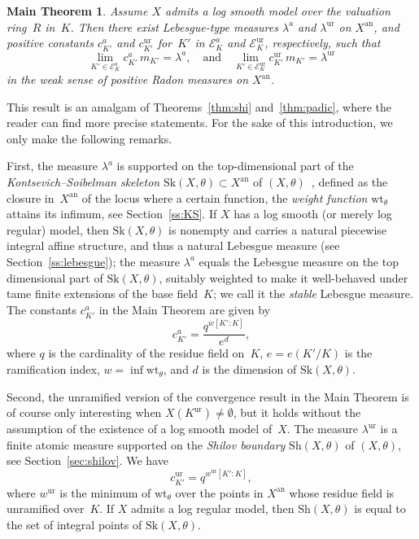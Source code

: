 \documentclass[11pt]{article}
\let\mathcal\mathscr
\newtheorem*{theorem*}{Main Theorem}
\theoremstyle{definition}
\numberwithin{equation}{subsection}
\newcommand{\an}{\mathrm{an}}
\newcommand{\Sh}{\mathrm{Sh}}
\newcommand{\Sk}{\mathrm{Sk}}
\newcommand{\ur}{\mathrm{ur}}
\newcommand{\wt}{\mathrm{wt}}
\let\form\theta
\let\Leb\lambda
\begin{document}
\begin{theorem*}
Assume $X$ admits a log smooth model over the valuation ring~$R$ in~$K$. Then there exist Lebesgue-type measures $\Leb^a$ and $\Leb^{\ur}$ on $X^{\an}$, and positive constants $c_{K'}^a$ and $c_{K'}^{\ur}$ for~$K'$ in $\mathcal{E}^a_K$ and $\mathcal{E}^{\ur}_K$, respectively, such that
\begin{equation*}
\lim_{K'\in\mathcal{E}^a_K}c_{K'}^a\,m_{K'}=\Leb^a,
\quad\text{and}\quad
\lim_{K'\in\mathcal{E}^{\ur}_K}c^{\ur}_{K'}\,m_{K'}=\Leb^{\ur}
\end{equation*}
in the weak sense of positive Radon measures on $X^{\an}$.
\end{theorem*}
This result is an amalgam of Theorems~\ref{thm:shi} and~\ref{thm:padic}, where the reader can find more precise statements. For the sake of this introduction, we only make the following remarks.

First, the measure $\Leb^a$ is supported on the top-dimensional part of the {\em Kontsevich--Soibelman skeleton} $\Sk(X,\form)\subset X^{\an}$ of $(X,\form)$~\cite{KS,MuNi}, defined as the closure in~$X^{\an}$ of the locus where a certain function, the \emph{weight function} $\wt_\form$ attains its infimum, see Section~\ref{ss:KS}.
If $X$ has a log smooth (or merely log regular) model, then $\Sk(X,\form)$ is nonempty and carries a natural piecewise integral affine structure, and thus a natural Lebesgue measure (see Section~\ref{ss:lebesgue}); the measure $\Leb^a$ equals the Lebesgue measure on the top dimensional part of $\Sk(X,\form)$, suitably
weighted to make it well-behaved under tame finite extensions of the base field~$K$; we call it the \emph{stable} Lebesgue measure. The constants $c_{K'}^a$ in the Main Theorem are given by
\begin{equation*}
c_{K'}^a=\frac{q^{w[K':K]}}{e^d},
\end{equation*}
where $q$ is the cardinality of the residue field on~$K$, $e=e(K'/K)$ is the ramification index, $w=\inf\wt_\form$, and $d$ is the dimension of $\Sk(X,\form)$.

Second, the unramified version of the convergence result in the Main Theorem is of course only interesting when $X(K^{\ur})\ne\emptyset$, but it holds without the assumption of the existence of a log smooth model of~$X$. The measure $\Leb^{\ur}$ is a finite atomic measure supported on the \emph{Shilov boundary} $\Sh(X,\form)$ of $(X,\form)$, see Section~\ref{sec:shilov}.
We have
\begin{equation*}
c_{K'}^{\ur}=q^{w^{\ur}[K':K]},
\end{equation*}
where $w^{\ur}$ is the minimum of $\wt_\form$ over the points in $X^{\an}$ whose residue field is unramified over~$K$.
If $X$ admits a log regular model, then $\Sh(X,\form)$ is equal to
the set of integral points of $\Sk(X,\form)$.
\end{document}
